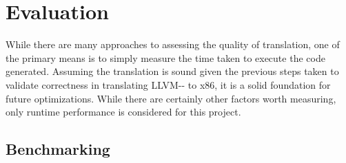 \documentclass{article}
\begin{document}









\section{Evaluation}

While there are many approaches to assessing the quality of translation, one of the primary means is to simply measure the time taken to execute the code generated. 
Assuming the translation is sound given the previous steps taken to validate correctness in translating LLVM-{}- to x86, it is a solid foundation for future optimizations. While there are certainly other factors worth measuring, only runtime performance is considered for this project. %







\subsection{Benchmarking}
\end{document}
